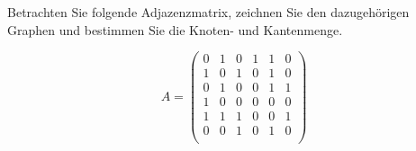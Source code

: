 \begin{kontr}
Betrachten Sie folgende Adjazenzmatrix, zeichnen Sie den dazugehörigen Graphen und bestimmen Sie die Knoten- und Kantenmenge.

\[A =  \begin{pmatrix}
  0 & 1 & 0 & 1 & 1 & 0 \\
  1 & 0 & 1 & 0 & 1 & 0 \\
  0 & 1 & 0 & 0 & 1 & 1 \\
  1 & 0 & 0 & 0 & 0 & 0 \\
  1 & 1 & 1 & 0 & 0 & 1 \\
  0 & 0 & 1 & 0 & 1 & 0 \\
 \end{pmatrix}
  \]
\end{kontr}

